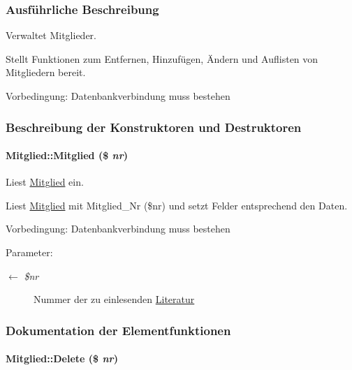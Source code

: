 \subsubsection{Ausf\"{u}hrliche Beschreibung}
Verwaltet Mitglieder. 

Stellt Funktionen zum Entfernen, Hinzufügen, Ändern und Auflisten von Mitgliedern bereit. \begin{Desc}
\item[Vorbedingung:]Datenbankverbindung muss bestehen \end{Desc}




\subsubsection{Beschreibung der Konstruktoren und Destruktoren}
\hypertarget{classMitglied_0ee18db6476bcb6d71d30978eb69c7ae}{
\paragraph[Mitglied]{\setlength{\rightskip}{0pt plus 5cm}Mitglied::Mitglied (\$ {\em nr})}\hfill}
\label{classMitglied_0ee18db6476bcb6d71d30978eb69c7ae}


Liest \hyperlink{classMitglied}{Mitglied} ein. 

Liest \hyperlink{classMitglied}{Mitglied} mit Mitglied\_\-Nr (\$nr) und setzt Felder entsprechend den Daten. \begin{Desc}
\item[Vorbedingung:]Datenbankverbindung muss bestehen \end{Desc}
\begin{Desc}
\item[Parameter:]
\begin{description}
\item[\mbox{$\leftarrow$} {\em \$nr}]Nummer der zu einlesenden \hyperlink{classLiteratur}{Literatur}\end{description}
\end{Desc}


\subsubsection{Dokumentation der Elementfunktionen}
\hypertarget{classMitglied_c6900c12663e9b228bf9942fc045b8b4}{
\paragraph[Delete]{\setlength{\rightskip}{0pt plus 5cm}Mitglied::Delete (\$ {\em nr})}\hfill}
\label{classMitglied_c6900c12663e9b228bf9942fc045b8b4}



